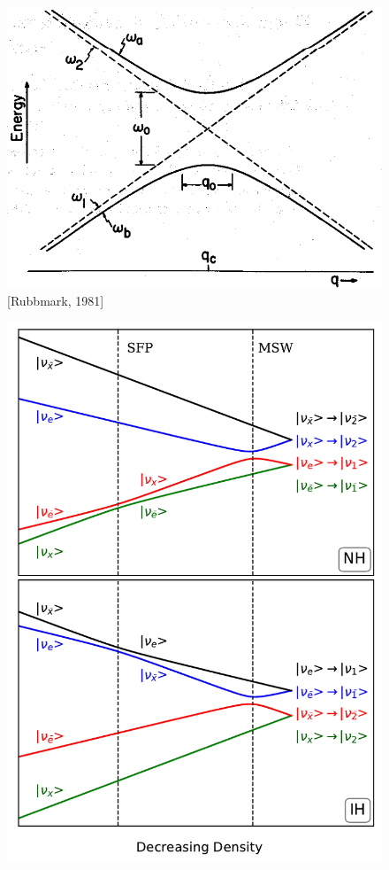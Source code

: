 \documentclass[10pt]{beamer}
\begin{document}
\begin{frame}
    \begin{minipage}{0.45\textwidth}
        \begin{figure}[hbt!]
            \centering
            \includegraphics[width=.9\textwidth]{fig/Avoid_Crossing_With_Paramters.png}
            {\tiny [Rubbmark, 1981]}
        \end{figure}
    \end{minipage}
    \hfill
    \begin{minipage}{0.45\textwidth}
        \begin{figure}[hbt!]
            \centering
            \includegraphics[width=.9\textwidth]{fig/eigenvalues.pdf}
        \end{figure}
    \end{minipage}
\end{frame}
\end{document}
